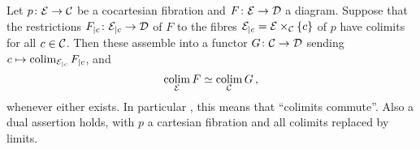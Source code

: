 \begin{prop}\label{prop:ColimitsCommute}
	Let $p\colon \Ee\morphism\Cc$ be a cocartesian fibration and $F\colon \Ee\morphism\Dd$ a diagram. Suppose that the restrictions $F_{|c}\colon\Ee_{|c}\morphism\Dd$ of $F$ to the fibres $\mathcal{E}_{|c}=\mathcal{E}\times_{\mathcal{C}}\{c\}$ of $p$ have colimits for all $c\in \mathcal{C}$. Then these assemble into a functor $G\colon \Cc\morphism\Dd$ sending $c\mapsto \operatorname*{colim}_{\mathcal{E}_{|c}}F_{|c}$, and
	\begin{equation*}
		\operatorname*{colim}_{\mathcal{E}} F\simeq \operatorname*{colim}_{\mathcal{C}} G\,,
	\end{equation*}
	whenever either exists. In particular , this means that \enquote{colimits commute}. Also a dual assertion holds, with $p$ a cartesian fibration and all colimits replaced by limits.
\end{prop}
